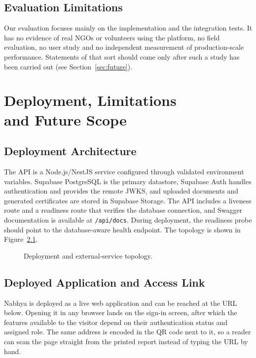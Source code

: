 \section{Evaluation Limitations}
Our evaluation focuses mainly on the implementation and the integration tests. It has no evidence of real NGOs or volunteers using the platform, no field evaluation, no user study and no independent measurement of production-scale performance. Statements of that sort should come only after such a study has been carried out (see Section~\ref{sec:future}).

\chapter[Deployment, Limitations and Future Scope]{Deployment, Limitations\\and Future Scope}
\label{ch:deployment}

\section{Deployment Architecture}
The API is a Node.js/NestJS service configured through validated environment variables. Supabase PostgreSQL is the primary datastore, Supabase Auth handles authentication and provides the remote JWKS, and uploaded documents and generated certificates are stored in Supabase Storage. The API includes a liveness route and a readiness route that verifies the database connection, and Swagger documentation is available at \texttt{/api/docs}. During deployment, the readiness probe should point to the database-aware health endpoint. The topology is shown in Figure~\ref{fig:deployment}.

\begin{figure}[H]
    \centering
    \caption{Deployment and external-service topology.}
    \label{fig:deployment}
\end{figure}

\clearpage
\section{Deployed Application and Access Link}
\label{sec:deployment-link}

Nabhya is deployed as a live web application and can be reached at the URL below. Opening it in any browser lands on the sign-in screen, after which the features available to the visitor depend on their authentication status and assigned role. The same address is encoded in the QR code next to it, so a reader can scan the page straight from the printed report instead of typing the URL by hand.

